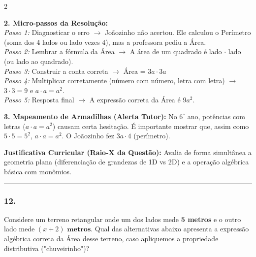 \begin{multicols*}{2}
\begin{tcolorbox}[colback=CorTitUm!5, colframe=CorTitUm, boxrule=1pt, arc=4pt, left=6pt, right=6pt, top=6pt, bottom=6pt]
    \textbf{2. Micro-passos da Resolução:}\\
    \textit{Passo 1:} Diagnosticar o erro $\rightarrow$ Joãozinho não acertou. Ele calculou o Perímetro (soma dos 4 lados ou lado vezes 4), mas a professora pediu a Área.\\
    \textit{Passo 2:} Lembrar a fórmula da Área $\rightarrow$ A área de um quadrado é lado $\cdot$ lado (ou lado ao quadrado).\\
    \textit{Passo 3:} Construir a conta correta $\rightarrow$ Área = $ 3a \cdot 3a $\\
    \textit{Passo 4:} Multiplicar corretamente (número com número, letra com letra) $\rightarrow$ $ 3 \cdot 3 = 9 $ e $ a \cdot a = a^2 $.\\
    \textit{Passo 5:} Resposta final $\rightarrow$ A expressão correta da Área é $ 9a^2 $.\par\vspace{0.1cm}
    
    \textbf{3. Mapeamento de Armadilhas (Alerta Tutor):} No $6^\circ$ ano, potências com letras ($a \cdot a = a^2$) causam certa hesitação. É importante mostrar que, assim como $5 \cdot 5 = 5^2$, $a \cdot a = a^2$. O Joãozinho fez $3a \cdot 4$ (perímetro).
    \end{tcolorbox}
    \vspace{0.15cm}
    
    \begin{boxexplicacao}
    \textbf{Justificativa Curricular (Raio-X da Questão):} Avalia de forma simultânea a geometria plana (diferenciação de grandezas de 1D vs 2D) e a operação algébrica básica com monômios.
    \end{boxexplicacao}
\fi

\par\vspace{\espacoQuestao}

\noindent\textcolor{CorLinha}{\rule{\linewidth}{0.5pt}} 
\par\vspace{\espacoPreQuestao}
\subsubsection*{12.} 
\begin{enunciadoLiteral}
Considere um terreno retangular onde um dos lados mede \textbf{5 metros} e o outro lado mede $ (x + 2) \textbf{ metros} $. Qual das alternativas abaixo apresenta a expressão algébrica correta da Área desse terreno, caso apliquemos a propriedade distributiva ("chuveirinho")?


\end{enunciadoLiteral}
\end{multicols*}
